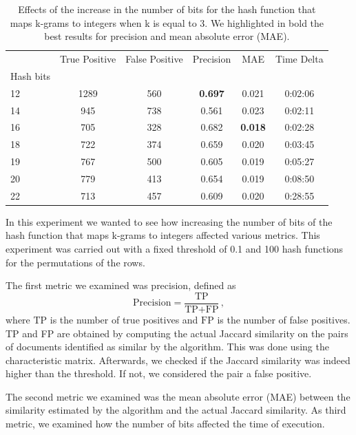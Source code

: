 \documentclass[runningheads]{llncs}
\begin{document}
\begin{table}
  \caption{Effects of the increase in the number of bits for the hash function that maps k-grams to integers when k is equal to 3. We highlighted in bold the best results for precision and mean absolute error (MAE).}
  \label{tab:experiments:buckets_k3}
  \centering
  \begin{tabular}{lccccc}
    \toprule
    {} &    True Positive &   False Positive &  Precision &    MAE & Time Delta \\
    Hash bits &       &      &            &        &            \\
    \midrule
    12        &  1289 &  560 &      \textbf{0.697} &  0.021 &    0:02:06 \\
    14        &   945 &  738 &      0.561 &  0.023 &    0:02:11 \\
    16        &   705 &  328 &      0.682 &  \textbf{0.018} &    0:02:28 \\
    18        &   722 &  374 &      0.659 &  0.020 &    0:03:45 \\
    19        &   767 &  500 &      0.605 &  0.019 &    0:05:27 \\
    20        &   779 &  413 &      0.654 &  0.019 &    0:08:50 \\
    22        &   713 &  457 &      0.609 &  0.020 &    0:28:55 \\
    \bottomrule
  \end{tabular}
\end{table}

In this experiment we wanted to see how increasing the number of bits of the hash function that maps k-grams to integers affected various metrics. This experiment was carried out with a fixed threshold of 0.1 and 100 hash functions for the permutations of the rows. 

The first metric we examined was precision, defined as 
\[
  \text{Precision} = \frac{\text{TP}}{\text{TP} + \text{FP}}\,,
\]
where $\text{TP}$ is the number of true positives and $\text{FP}$ is the number of false positives. TP and FP are obtained by computing the actual Jaccard similarity on the pairs of documents identified as similar by the algorithm. This was done using the characteristic matrix. Afterwards, we checked if the Jaccard similarity was indeed higher than the threshold. If not, we considered the pair a false positive.

The second metric we examined was the mean absolute error (MAE) between the similarity estimated by the algorithm and the actual Jaccard similarity. As third metric, we examined how the number of bits affected the time of execution.
\end{document}
